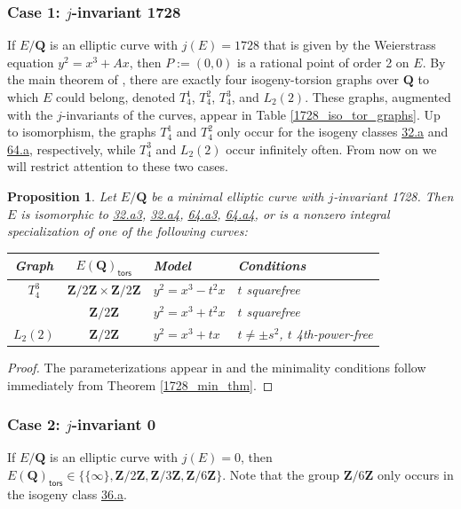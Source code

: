 \documentclass{amsart}
\newcommand{\Z}{\mathbf{Z}}
\newcommand{\Q}{\mathbf{Q}}
\newcommand{\tors}{\mathsf{tors}}
\numberwithin{equation}{section}
\theoremstyle{plain}
\newtheorem{prop}[equation]{Proposition}
\theoremstyle{remark}
\begin{document}
\subsubsection{Case 1: $j$-invariant 1728}  If $E/\Q$ is an elliptic curve with $j(E) = 1728$ that is given by the Weierstrass equation $y^2 = x^3 + Ax$, then $P := (0,0)$ is a rational point of order 2 on $E$.  By the main theorem of \cite{clz}, there are exactly four isogeny-torsion graphs over $\Q$ to which $E$ could belong, denoted $T_4^1$, $T_4^2$, $T_4^3$, and $L_2(2)$.  These graphs, augmented with the $j$-invariants of the curves, appear in Table \ref{1728_iso_tor_graphs}.  Up to isomorphism, the graphs $T_4^1$ and $T_4^2$ only occur for the isogeny classes \href{https://beta.lmfdb.org/EllipticCurve/Q/32/a/}{32.a} and \href{https://beta.lmfdb.org/EllipticCurve/Q/64/a/}{64.a}, respectively, while $T_4^3$ and $L_2(2)$ occur infinitely often. From now on we will restrict attention to these two cases.

\begin{prop} \label{1728_minimal_models}
Let $E/\Q$ be a minimal elliptic curve with $j$-invariant 1728.  Then $E$ is isomorphic to \href{https://beta.lmfdb.org/EllipticCurve/Q/32/a/3}{32.a3}, \href{https://beta.lmfdb.org/EllipticCurve/Q/32/a/4}{32.a4},  \href{https://beta.lmfdb.org/EllipticCurve/Q/64/a/3}{64.a3}, \href{https://beta.lmfdb.org/EllipticCurve/Q/64/a/4}{64.a4}, or is a nonzero integral specialization of one of the following curves:
\begin{center}
\begin{tabular}{|c|c|l|l|}
\hline
Graph & $E(\Q)_\tors$ & Model &  Conditions\\
\hline
$T_4^3$ & $\Z/2\Z \times \Z/2\Z$ & $y^2 = x^3-t^2x$ & $t$ squarefree\\
& $\Z/2\Z$ &$y^2 = x^3+t^2x$ & $t$ squarefree \\
\hline
$L_2(2)$ & $\Z/2\Z$ & $y^2 = x^3 +tx$ & $t \ne \pm s^2$, $t$ 4th-power-free \\
\hline
\end{tabular}
\end{center}
\end{prop}

\begin{proof}
The parameterizations appear in \cite[Table 5]{clz} and the minimality conditions follow immediately from Theorem \ref{1728_min_thm}.
\end{proof}

\subsubsection{Case 2: $j$-invariant 0} If $E/\Q$ is an elliptic curve with $j(E) = 0$, then $E(\Q)_\tors \in \lbrace \lbrace \infty \rbrace, \Z/2\Z, \Z/3\Z, \Z/6\Z \rbrace$.  Note that the group $\Z/6\Z$ only occurs in the isogeny class \href{https://beta.lmfdb.org/EllipticCurve/Q/36/a/}{36.a}.
\end{document}
